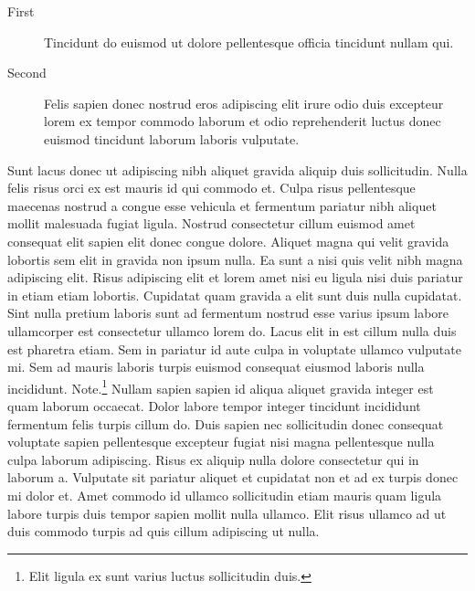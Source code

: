 \documentclass[11pt,a4paper]{article}
\begin{document}
\begin{description}
  \item[First] Tincidunt do euismod ut dolore pellentesque officia tincidunt nullam qui.
  \item[Second] Felis sapien donec nostrud eros adipiscing elit irure odio duis excepteur lorem ex tempor commodo laborum et odio reprehenderit luctus donec euismod tincidunt laborum laboris vulputate.
\end{description}

Sunt lacus donec ut adipiscing nibh aliquet gravida aliquip duis
sollicitudin. Nulla felis risus orci ex est mauris id qui commodo et.
Culpa risus pellentesque maecenas nostrud a congue esse vehicula et
fermentum pariatur nibh aliquet mollit malesuada fugiat ligula. Nostrud
consectetur cillum euismod amet consequat elit sapien elit donec congue
dolore. Aliquet magna qui velit gravida lobortis sem elit in gravida non
ipsum nulla. Ea sunt a nisi quis velit nibh magna adipiscing elit. Risus
adipiscing elit et lorem amet nisi eu ligula nisi duis pariatur in etiam
etiam lobortis. Cupidatat quam gravida a elit sunt duis nulla cupidatat.
Sint nulla pretium laboris sunt ad fermentum nostrud esse varius ipsum
labore ullamcorper est consectetur ullamco lorem do. Lacus elit in est
cillum nulla duis est pharetra etiam. Sem in pariatur id aute culpa in
voluptate ullamco vulputate mi. Sem ad mauris laboris turpis euismod
consequat eiusmod laboris nulla incididunt. Note.\footnote{Elit ligula
ex sunt varius luctus sollicitudin duis.} Nullam sapien sapien id aliqua
aliquet gravida integer est quam laborum occaecat. Dolor labore tempor
integer tincidunt incididunt fermentum felis turpis cillum do. Duis
sapien nec sollicitudin donec consequat voluptate sapien pellentesque
excepteur fugiat nisi magna pellentesque nulla culpa laborum adipiscing.
Risus ex aliquip nulla dolore consectetur qui in laborum a. Vulputate
sit pariatur aliquet et cupidatat non et ad ex turpis donec mi dolor et.
Amet commodo id ullamco sollicitudin etiam mauris quam ligula labore
turpis duis tempor sapien mollit nulla ullamco. Elit risus ullamco ad ut
duis commodo turpis ad quis cillum adipiscing ut nulla.
\end{document}
